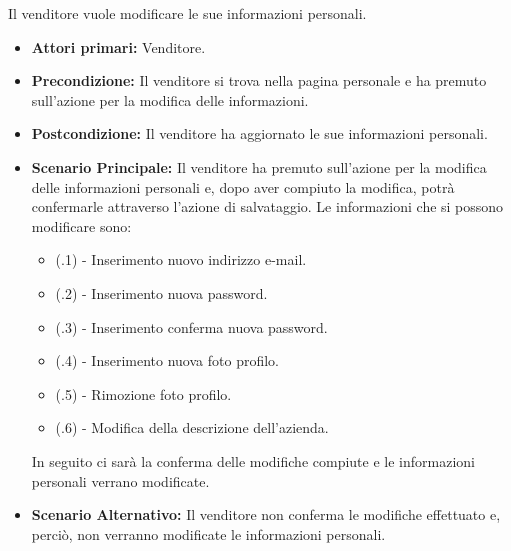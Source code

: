 Il venditore vuole modificare le sue informazioni personali.
\begin{itemize}
    \item \textbf{Attori primari:} Venditore.
    \item \textbf{Precondizione:} Il venditore si trova nella pagina personale e ha premuto sull'azione per la modifica delle informazioni.
    \item \textbf{Postcondizione:} Il venditore ha aggiornato le sue informazioni personali.
    \item \textbf{Scenario Principale:} Il venditore ha premuto sull'azione per la modifica delle informazioni personali e, dopo aver compiuto la modifica, potrà confermarle attraverso l'azione di salvataggio. Le informazioni che si possono modificare sono:
    \begin{itemize}
        \item (\actualUC.1) - Inserimento nuovo indirizzo e-mail.
        \item (\actualUC.2) - Inserimento nuova password.
        \item (\actualUC.3) - Inserimento conferma nuova password.
        \item (\actualUC.4) - Inserimento nuova foto profilo.
        \item (\actualUC.5) - Rimozione foto profilo.
        \item (\actualUC.6) - Modifica della descrizione dell'azienda.
    \end{itemize}
    In seguito ci sarà la conferma delle modifiche compiute e le informazioni personali verrano modificate.
    \item \textbf{Scenario Alternativo:} Il venditore non conferma le modifiche effettuato e, perciò, non verranno modificate le informazioni personali.
\end{itemize}
\resetSubUC

